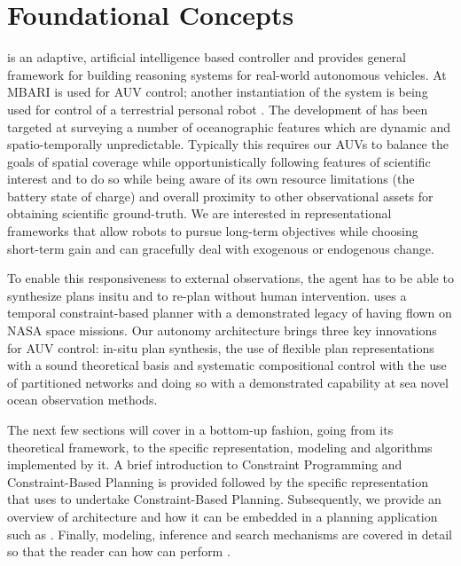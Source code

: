 \section{Foundational Concepts}
\label{sec:concepts}

\rx is an adaptive, artificial intelligence based controller and
provides  general framework for building reasoning systems
for real-world autonomous vehicles. At MBARI \rx is used for AUV
control; another instantiation of the system is being used for control
of a terrestrial personal robot \cite{pr2, Meeussen:2010dn}. The
development of \rx has been targeted at surveying a number of
oceanographic features which are dynamic and spatio-temporally
unpredictable. Typically this requires our AUVs to balance the goals
of spatial coverage while opportunistically following features of
scientific interest and to do so while being aware of its own resource
limitations (\eg the battery state of charge) and overall proximity to
other observational assets for obtaining scientific ground-truth. We
are interested in representational frameworks that allow robots to
pursue long-term objectives while choosing short-term gain and can
gracefully deal with exogenous or endogenous change.

To enable this responsiveness to external observations, the agent has
to be able to synthesize plans insitu and to re-plan without human
intervention. \rx uses a temporal constraint-based planner with a
demonstrated legacy of having flown on NASA space missions. Our
autonomy architecture brings three key innovations for AUV control:
in-situ plan synthesis, the use of flexible plan representations with
a sound theoretical basis and systematic compositional control with
the use of partitioned networks and doing so with a demonstrated
capability at sea  novel ocean observation methods.

The next few sections will cover \eu in a bottom-up fashion, going
from its  theoretical framework, to the specific
representation, modeling and algorithms implemented by it.  A brief
introduction to Constraint Programming and Constraint-Based Planning
is provided followed by the specific representation that \eu uses to
undertake Constraint-Based Planning.  Subsequently, we provide an
overview of \eus architecture and how it can be embedded in a planning
application such as \rxe. Finally, \eus modeling, inference and search
mechanisms are covered in detail so that the reader can
 how \rx can perform .

